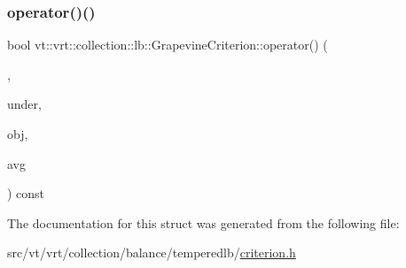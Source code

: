 \subsubsection{\texorpdfstring{operator()()}{operator()()}}
{\footnotesize\ttfamily bool vt\+::vrt\+::collection\+::lb\+::\+Grapevine\+Criterion\+::operator() (\begin{DoxyParamCaption}\item[{\hyperlink{namespacevt_a8fb51741340b87d7aaee0bef60e9896b}{Load\+Type}}]{,  }\item[{\hyperlink{namespacevt_a8fb51741340b87d7aaee0bef60e9896b}{Load\+Type}}]{under,  }\item[{\hyperlink{namespacevt_a8fb51741340b87d7aaee0bef60e9896b}{Load\+Type}}]{obj,  }\item[{\hyperlink{namespacevt_a8fb51741340b87d7aaee0bef60e9896b}{Load\+Type}}]{avg }\end{DoxyParamCaption}) const\hspace{0.3cm}{\ttfamily [inline]}}



The documentation for this struct was generated from the following file\+:\begin{DoxyCompactItemize}
\item 
src/vt/vrt/collection/balance/temperedlb/\hyperlink{criterion_8h}{criterion.\+h}\end{DoxyCompactItemize}
